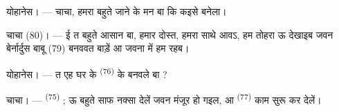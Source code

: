 %
%

\VUsaut{6.0mm}
\VUsaut{1.4mm}
\VUsaut{2.2mm}

\VUsaut{3.0mm}

\textsc{योहानेस}। --- चाचा, हमरा बहुते जाने के मन बा कि 
कइसे बनेला।

\textsc{चाचा} (80)। --- ई त बहुते आसान बा, हमार दोस्त, हमरा साथे आवऽ,
हम तोहरा ऊ देखाइब जवन बेर्नार्दुस बाबू (79) बनववत बाड़ें आ जवना में हम
रहब।

\textsc{योहानेस}। --- त एह घर के  \textsuperscript{(76)}
के बनवले बा ?

\textsc{चाचा}। ---  \textsuperscript{(75)} ; ऊ बहुते
साफ नक्सा देलें जवन मंजूर हो गइल, आ 
\textsuperscript{(77)} काम सुरू कर देलें।

